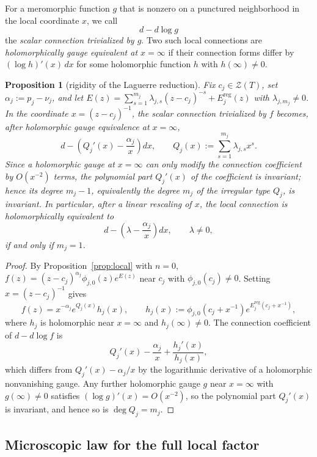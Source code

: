\documentclass[reqno]{article}
\newtheorem{prop}[theorem]{Proposition}
\theoremstyle{definition}
\theoremstyle{remark}
\theoremstyle{plain}
\newcommand{\Z}{\mathcal Z}
\begin{document}
For a meromorphic function $g$ that is nonzero on a punctured neighborhood in the local coordinate $x$, we call
$$d-d\log g$$
the \emph{scalar connection trivialized by $g$}. Two such local connections are \emph{holomorphically gauge equivalent at $x=\infty$} if their connection forms differ by $(\log h)'(x)\,dx$ for some holomorphic function $h$ with $h(\infty)\ne0$.

\begin{prop}[rigidity of the Laguerre reduction]\label{prop:rigid-laguerre}
Fix $c_j\in \Z(T)$, set $\alpha_j:=p_j-\nu_j$, and let $E(z)=\sum_{s=1}^{m_j}\lambda_{j,s}(z-c_j)^{-s}+E_j^{\mathrm{reg}}(z)$ with $\lambda_{j,m_j}\ne0$. In the coordinate $x=(z-c_j)^{-1}$, the scalar connection trivialized by $f$ becomes, after holomorphic gauge equivalence at $x=\infty$,
$$d-\left(Q_j'(x)-\frac{\alpha_j}{x}\right)dx,\qquad Q_j(x):=\sum_{s=1}^{m_j}\lambda_{j,s}x^s.$$
Since a holomorphic gauge at $x=\infty$ can only modify the connection coefficient by $O(x^{-2})$ terms, the polynomial part $Q_j'(x)$ of the coefficient is invariant; hence its degree $m_j-1$, equivalently the degree $m_j$ of the irregular type $Q_j$, is invariant. In particular, after a linear rescaling of $x$, the local connection is holomorphically equivalent to
$$d-\left(\lambda-\frac{\alpha_j}{x}\right)dx,\qquad \lambda\ne0,$$
if and only if $m_j=1$.
\end{prop}

\begin{proof}
By Proposition~\ref{prop:local} with $n=0$, $f(z)=(z-c_j)^{\alpha_j}\phi_{j,0}(z)e^{E(z)}$ near $c_j$ with $\phi_{j,0}(c_j)\ne0$. Setting $x=(z-c_j)^{-1}$ gives
$$f(z)=x^{-\alpha_j}e^{Q_j(x)}h_j(x),\qquad
h_j(x):=\phi_{j,0}(c_j+x^{-1})e^{E_j^{\mathrm{reg}}(c_j+x^{-1})},$$
where $h_j$ is holomorphic near $x=\infty$ and $h_j(\infty)\ne0$. The connection coefficient of $d-d\log f$ is
$$Q_j'(x)-\frac{\alpha_j}{x}+\frac{h_j'(x)}{h_j(x)},$$
which differs from $Q_j'(x)-\alpha_j/x$ by the logarithmic derivative of a holomorphic nonvanishing gauge. Any further holomorphic gauge $g$ near $x=\infty$ with $g(\infty)\ne0$ satisfies $(\log g)'(x)=O(x^{-2})$, so the polynomial part $Q_j'(x)$ is invariant, and hence so is $\deg Q_j=m_j$.
\end{proof}

\subsection{Microscopic law for the full local factor}\label{sec:full-local-factor}
\end{document}
